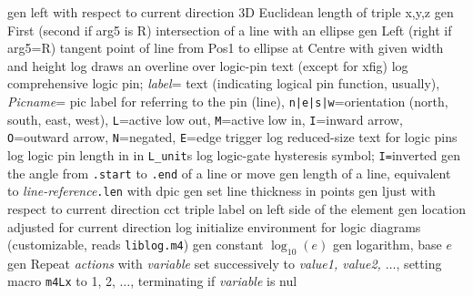   {gen}
  {left with respect to current direction }
  {3D}
  {Euclidean length of triple x,y,z}
  {gen}
  { First (second if arg5 is R) intersection of a line with an ellipse}
  {gen}
  { Left (right if arg5=R) tangent point of line
     from Pos1 to ellipse at Centre with given width and height}
  {log}
  {draws an overline over logic-pin text (except for xfig)}
  {log}
  {comprehensive logic pin;
   {\sl label}= text (indicating logical pin function, usually),
   {\sl Picname}= pic label for referring to the pin (line),
   {\tt n|e|s|w}=orientation (north, south, east, west),
   {\tt L}=active low out,
   {\tt M}=active low in,
   {\tt I}=inward arrow,
   {\tt O}=outward arrow,
   {\tt N}=negated,
   {\tt E}=edge trigger}
  {log}
  {reduced-size text for logic pins}
  {log}
  {logic pin length in in {\tt L\_unit}s}
  {log}
  {logic-gate hysteresis symbol; {\tt I=}inverted}
  {gen}
  {the angle from {\tt .start} to {\tt .end} of a line or move}
  {gen}
  {length of a line, equivalent to {\sl line-reference}{\tt .len}
   with dpic}
  {gen}
  {set line thickness in points}
  {gen}
  {ljust with respect to current direction}
  {cct}
  {triple label on left side of the element }
  {gen}
  {location adjusted for current direction}
  {log}
  {initialize environment for logic diagrams
    (customizable, reads {\tt liblog.m4})}
  {gen}
  {constant $\log_{10}(e)$}
  {gen}
  {logarithm, base $e$}
  {gen}
  {Repeat {\sl actions} with {\sl variable} set successively to
   {\sl value1, value2, $\ldots$}, setting macro {\tt m4Lx} to 1, 2, $\ldots$,
   terminating if {\sl variable} is nul}

